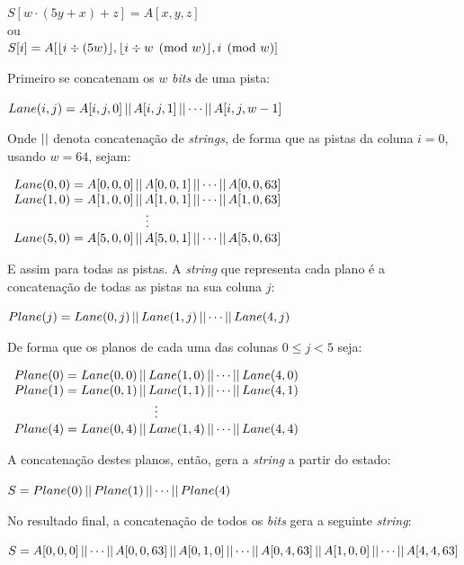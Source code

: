 \begin{center}
    $S[w \cdot (5y+x) + z] = A[x, y, z]$ \\
    ou \\
    $S[i] = A[\floor*{i \div (5w)}, \floor*{i \div w \pmod{w}}, i \pmod{w}]$
\end{center}

Primeiro se concatenam os $w$ \textit{bits} de uma pista:

$Lane(i, j) = A[i, j, 0] \operatorname{\lvert\rvert} A[i, j, 1] \operatorname{\lvert\rvert} \cdots \operatorname{\lvert\rvert} A[i, j, w-1]$

Onde $\operatorname{\lvert\rvert}$ denota concatenação de \textit{strings}, de forma que as pistas
da coluna $i = 0$, usando $w = 64$, sejam:

$\begin{array}{c}
    Lane(0, 0) = A[0, 0, 0] \operatorname{\lvert\rvert} A[0, 0, 1] \operatorname{\lvert\rvert} \cdots \operatorname{\lvert\rvert} A[0, 0, 63] \\
    Lane(1, 0) = A[1, 0, 0] \operatorname{\lvert\rvert} A[1, 0, 1] \operatorname{\lvert\rvert} \cdots \operatorname{\lvert\rvert} A[1, 0, 63] \\
    \vdots \\
    Lane(5, 0) = A[5, 0, 0] \operatorname{\lvert\rvert} A[5, 0, 1] \operatorname{\lvert\rvert} \cdots \operatorname{\lvert\rvert} A[5, 0, 63]
\end{array}$

E assim para todas as pistas. A \textit{string} que representa cada plano é a
concatenação de todas as pistas na sua coluna $j$:

$Plane(j) = Lane(0, j) \operatorname{\lvert\rvert} Lane(1, j) \operatorname{\lvert\rvert} \cdots \operatorname{\lvert\rvert} Lane(4, j)$

De forma que os planos de cada uma das colunas $0 \leq j < 5$ seja:

$\begin{array}{c}
    Plane(0) = Lane(0, 0) \operatorname{\lvert\rvert} Lane(1, 0) \operatorname{\lvert\rvert} \cdots \operatorname{\lvert\rvert} Lane(4, 0) \\
    Plane(1) = Lane(0, 1) \operatorname{\lvert\rvert} Lane(1, 1) \operatorname{\lvert\rvert} \cdots \operatorname{\lvert\rvert} Lane(4, 1) \\
    \vdots \\
    Plane(4) = Lane(0, 4) \operatorname{\lvert\rvert} Lane(1, 4) \operatorname{\lvert\rvert} \cdots \operatorname{\lvert\rvert} Lane(4, 4)
\end{array}$

A concatenação destes planos, então, gera a \textit{string} a partir do estado:

$S = Plane(0) \operatorname{\lvert\rvert} Plane(1) \operatorname{\lvert\rvert} \cdots \operatorname{\lvert\rvert} Plane(4)$

No resultado final, a concatenação de todos os \textit{bits} gera a seguinte
\textit{string}:

$S = A[0, 0, 0] \operatorname{\lvert\rvert} \cdots \operatorname{\lvert\rvert} A[0, 0, 63] \operatorname{\lvert\rvert} A[0, 1, 0] \operatorname{\lvert\rvert} \cdots \operatorname{\lvert\rvert} A[0, 4, 63] \operatorname{\lvert\rvert} A[1, 0, 0] \operatorname{\lvert\rvert} \cdots \operatorname{\lvert\rvert} A[4, 4, 63]$

